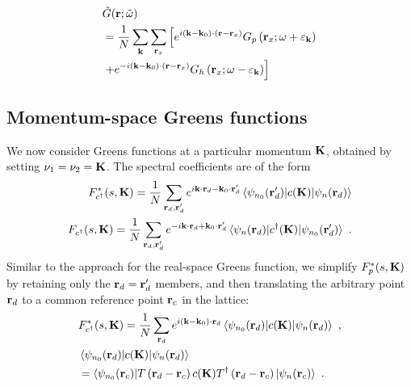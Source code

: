 \documentclass[reprint,hidelinks]{revtex4-2}
\begin{document}
\begin{equation}\begin{aligned}
	&\tilde G({\bf r}; \tilde\omega) \\
	&= \frac{1}{N}\sum_{{\bf k}}\sum_{{\bf r}_x}  \left[e^{i \left({\bf k}- {\bf k}_0\right)\cdot\left({\bf r} - {\bf r}_x\right)}G_p\left({\bf r}_x;\omega + \varepsilon_{\bf k}\right) \right.\\
	&\left.+ e^{-i \left({\bf k}- {\bf k}_0\right)\cdot\left({\bf r} - {\bf r}_x\right)}G_h\left({\bf r}_x;\omega - \varepsilon_{\bf k}\right)\right]
\end{aligned}\end{equation}

\subsection{Momentum-space Greens functions}
We now consider Greens functions at a particular momentum \({\bf K}\), obtained by setting \(\nu_1=\nu_2={\bf K}\). The spectral coefficients are of the form
\begin{equation}\begin{aligned}
	F_{c^\dagger}^*(s, {\bf K}) = \frac{1}{N}\sum_{{\bf r}_d, {\bf r}_d^\prime} e^{i {\bf k}\cdot{\bf r}_d - {\bf k}_0\cdot{\bf r}_d^\prime} \braket{\psi_{n_0}({\bf r}_d^\prime)|c({\bf K})|\psi_{n}({\bf r}_d)}\\
	F_{c^\dagger}(s, {\bf K}) = \frac{1}{N}\sum_{{\bf r}_d, {\bf r}_d^\prime} e^{-i {\bf k}\cdot{\bf r}_d + {\bf k}_0\cdot{\bf r}_d^\prime} \braket{\psi_n({\bf r}_d)|c^\dagger({\bf K})|\psi_{n_0}({\bf r}_d^\prime)}~.
\end{aligned}\end{equation}
Similar to the approach for the real-space Greens function, we simplify \(F^*_p(s, {\bf K})\) by retaining only the \({\bf r}_d = {\bf r}_d^\prime\) members, and then translating the arbitrary point \({\bf r}_d\) to a common reference point \({\bf r}_c\) in the lattice:
\begin{equation}\begin{aligned}
	&F_{c^\dagger}^*(s, {\bf K}) = \frac{1}{N}\sum_{{\bf r}_d} e^{i \left({\bf k} - {\bf k}_0\right)\cdot{\bf r}_d} \braket{\psi_{n_0}({\bf r}_d)|c({\bf K})|\psi_{n}({\bf r}_d)}~,\\
	&\braket{\psi_{n_0}({\bf r}_d)|c({\bf K})|\psi_{n}({\bf r}_d)}\\
	&= \braket{\psi_{n_0}({\bf r}_c)| T\left({\bf r}_d - {\bf r}_c\right) c({\bf K}) T^\dagger\left({\bf r}_d - {\bf r}_c\right) |\psi_{n}({\bf r}_c)}~.
\end{aligned}\end{equation}
\end{document}
